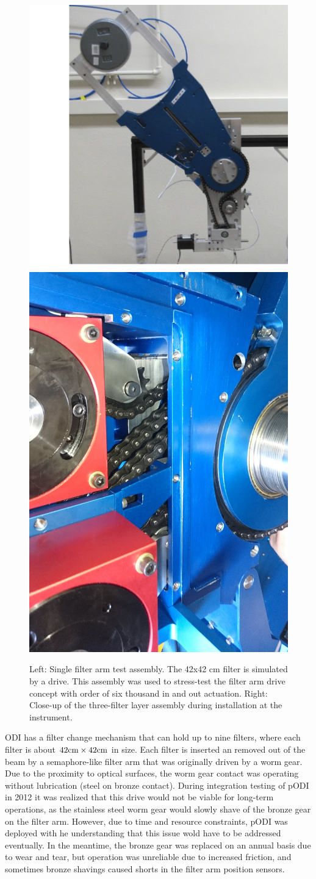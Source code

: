 \documentclass[]{spieman}
\begin{document}
\begin{figure}
	
	\hfill
	\includegraphics[height=0.49\textwidth]{images/filterdrivetest.png}	\hfill
	\includegraphics[height=0.49\textwidth]{images/DSC_0309.JPG} \hfill \hfill
    
	\caption{\label{fig_filterdrive} Left: Single filter arm test assembly. The
    42x42 cm filter is simulated by a drive. This assembly was used to stress-test
    the filter arm drive concept with order of six thousand in and out actuation.
    Right: Close-up of the three-filter layer assembly during installation at the
    instrument.} 

\end{figure}

ODI has a filter change mechanism that can hold up to nine filters, where each
filter is about $42 \rm{cm} \times 42 \rm{cm}$ in size. Each filter is inserted an removed out of
the beam by a semaphore-like filter arm that was originally driven by a worm
gear\cite{Muller2008}. Due to the proximity to optical surfaces, the worm gear
contact was operating without lubrication (steel on bronze contact). 
During integration testing of pODI in 2012 it was realized that this drive would not 
be viable for long-term operations, as the stainless steel worm gear would slowly
shave of the bronze gear on the filter arm. However, due to time and resource
constraints, pODI was deployed with he understanding that this issue wold have
to be addressed eventually. In the meantime, the bronze gear was replaced on an annual basis
due to wear and tear, but operation was unreliable due to increased friction, and sometimes
bronze shavings caused shorts in the filter arm position sensors.
\end{document}
